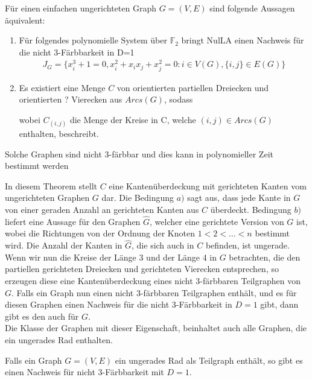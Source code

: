 \begin{theorem} \label{3colorTheorem}
Für einen einfachen ungerichteten Graph $G=(V,E)$ sind folgende Aussagen äquivalent:
\begin{enumerate}
	\item Für folgendes polynomielle System über $\mathbb{F}_2$ bringt NulLA einen Nachweis für die nicht 3-Färbbarkeit in D=1
	\begin{align*}
	J_G = \{x_i^3+1=0,x_i^2+x_ix_j+x_j^2=0:i\in V(G),\{i,j\}\in E(G)\}
	\end{align*}
	\item Es existiert eine Menge $C$ von orientierten partiellen Dreiecken und orientierten ? Vierecken aus $Arcs(G)$, sodass 
	\begin{compactenum}[a)]
		\item  $\left|C_{(i,j)}\right|+\left|C_{(j,i)}\right| \equiv 0 \mod{2} \quad \forall \{i,j\} \in E$
		\item $\sum_{(i,j) \in Arcs(G), i < j} \left|C_{(i,j)}\right| \equiv 1 \mod{2}$
	\end{compactenum}
	wobei $C_{(i,j)}$ die Menge der Kreise in C, welche $(i,j) \in Arcs(G)$ enthalten, beschreibt.
\end{enumerate}
Solche Graphen sind nicht 3-färbbar und dies kann in polynomieller Zeit bestimmt werden
\end{theorem}


\noindent In diesem Theorem stellt $C$ eine Kantenüberdeckung mit gerichteten Kanten vom ungerichteten Graphen $G$ dar. Die Bedingung $a)$ sagt aus, dass jede Kante in $G$ von einer geraden Anzahl an gerichteten Kanten aus $C$ überdeckt. Bedingung $b)$ liefert eine Aussage für den Graphen $\widehat{G}$, welcher eine gerichtete Version von $G$ ist, wobei die Richtungen von der Ordnung der Knoten $1<2<\ldots <n$ bestimmt wird. Die Anzahl der Kanten in $\widehat{G}$, die sich auch in $C$ befinden, ist ungerade. Wenn wir nun die Kreise der Länge 3 und der Länge 4 in $G$ betrachten, die den partiellen gerichteten Dreiecken und gerichteten Vierecken entsprechen, so erzeugen diese eine Kantenüberdeckung eines nicht 3-färbbaren Teilgraphen von $G$. Falls ein Graph nun einen nicht 3-färbbaren Teilgraphen enthält, und es für diesen Graphen einen Nachweis für die nicht 3-Färbbarkeit in $D=1$ gibt, dann gibt es den auch für $G$. \\
Die Klasse der Graphen mit dieser Eigenschaft, beinhaltet auch alle Graphen, die ein ungerades Rad enthalten.

\begin{corollary}
Falls ein Graph $G=(V,E)$ ein ungerades Rad als Teilgraph enthält, so gibt es einen Nachweis für nicht 3-Färbbarkeit mit $D=1$.
\end{corollary} 

